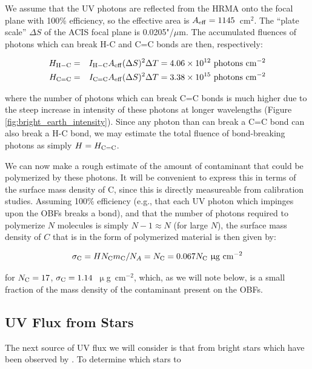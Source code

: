 \documentclass[11pt]{article}
\begin{document}
We assume that the UV photons are reflected from the HRMA onto the focal plane with 100\% efficiency,
so the effective area is $A_{\rm eff} = 1145$~cm$^2$. The ``plate scale'' $\Delta{S}$ of the ACIS focal plane is
0.0205"/$\mu$m. The accumulated fluences of photons which can break H-C and C=C bonds are then, respectively:

\begin{eqnarray}
H_{\rm H-C} &=& I_{\rm H-C}A_{\rm eff}(\Delta{S})^2\Delta{T} = 4.06 \times 10^{12}~{\rm photons~cm^{-2}} \\
H_{\rm C=C} &=& I_{\rm C=C}A_{\rm eff}(\Delta{S})^2\Delta{T} = 3.38 \times 10^{15}~{\rm photons~cm^{-2}}\label{eqn:fluence}
\end{eqnarray}

\noindent
where the number of photons which can break C=C bonds is much higher due to the steep increase in intensity of these photons at longer wavelengths (Figure \ref{fig:bright_earth_intensity}). Since any photon than can break a C=C bond can also break a H-C bond, we may estimate the total fluence of bond-breaking photons as simply $H = H_{\rm C=C}$.

We can now make a rough estimate of the amount of contaminant that could be polymerized by these photons. It will be
convenient to express this in terms of the surface mass density of C, since this is directly measureable from calibration
studies. Assuming 100\% efficiency (e.g., that each UV photon which impinges upon the OBFs breaks a bond), and that the number
of photons required to polymerize $N$ molecules is simply $N-1 \approx N$ (for large $N$), the surface mass density of
$C$ that is in the form of polymerized material is then given by:

\begin{equation}\label{eqn:pred_poly}
\sigma_{\rm C} = HN_{\rm C}m_{\rm C}/N_A = N_{\rm C} = 0.067N_{\rm C}~\upmu{\rm g~cm}^{-2}
\end{equation}

\noindent
for $N_{\rm C} = 17$, $\sigma_{\rm C} = 1.14$~$\upmu$g~cm$^{-2}$, which, as we will note below, is a small fraction of the mass density of the
contaminant present on the OBFs.

\subsection{UV Flux from Stars}

The next source of UV flux we will consider is that from bright stars which have been observed by \chandra. To determine which stars to
\end{document}
